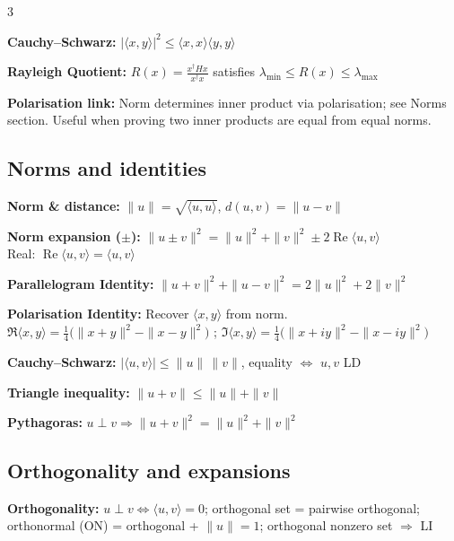 \documentclass[10pt]{article}
\newcommand{\ip}[2]{\langle #1,#2\rangle}
\newenvironment{cheatitems}{\par\vspace{-1pt}}{\par\vspace{-1pt}}
\newcommand{\cheatrow}[2]{%
  \par\noindent\textbf{#1:}\nobreak\enspace #2\par
}
\begin{document}
\begin{multicols}{3}
\begin{cheatitems}
\cheatrow{Cauchy--Schwarz}{
$|\langle x,y\rangle|^2 \le \langle x,x\rangle \langle y,y\rangle$
}

\cheatrow{Rayleigh Quotient}{
$R(x)=\frac{x^\dagger H x}{x^\dagger x}$ satisfies $\lambda_{\min}\le R(x)\le \lambda_{\max}$
}

\cheatrow{Polarisation link}{
Norm determines inner product via polarisation; see Norms section. 
Useful when proving two inner products are equal from equal norms.
}
\end{cheatitems}



\vspace{1pt}
\subsection*{Norms and identities}
\begin{cheatitems}

\cheatrow{Norm \& distance}{
$\|u\|=\sqrt{\ip{u}{u}}$, \quad $d(u,v)=\|u-v\|$
}

\cheatrow{Norm expansion ($\pm$)}{
$\|u\pm v\|^2=\|u\|^2+\|v\|^2\pm 2\operatorname{Re}\langle u,v\rangle$\\
Real: $\operatorname{Re}\langle u,v\rangle=\langle u,v\rangle$
}

\cheatrow{Parallelogram Identity}{
$\|u+v\|^2+\|u-v\|^2=2\|u\|^2+2\|v\|^2$
}

\cheatrow{Polarisation Identity}{
Recover $\langle x,y\rangle$ from norm.\\
$\displaystyle \Re\langle x,y\rangle=\frac{1}{4}\big(\|x+y\|^2-\|x-y\|^2\big)$ ; $\displaystyle \Im\langle x,y\rangle=\frac{1}{4}\big(\|x+iy\|^2-\|x-iy\|^2\big)$
}

\cheatrow{Cauchy--Schwarz}{
$|\ip{u}{v}|\le \|u\|\,\|v\|$, equality $\iff$ $u,v$ LD
}

\cheatrow{Triangle inequality}{
$\|u+v\|\le \|u\|+\|v\|$
}

\cheatrow{Pythagoras}{
$u\perp v \Rightarrow \|u+v\|^2=\|u\|^2+\|v\|^2$
}

\end{cheatitems}

\subsection*{Orthogonality and expansions}
\begin{cheatitems}

\cheatrow{Orthogonality}{
$u\perp v \iff \ip{u}{v}=0$; orthogonal set = pairwise orthogonal;  
orthonormal (ON) = orthogonal + $\|u\|=1$; orthogonal nonzero set $\Rightarrow$ LI
}


\end{cheatitems}
\end{multicols}
\end{document}
